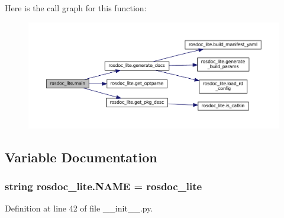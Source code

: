 Here is the call graph for this function\+:
\nopagebreak
\begin{figure}[H]
\begin{center}
\leavevmode
\includegraphics[width=350pt]{namespacerosdoc__lite_af17b2a5046f7827add27b1cc8deb06a0_cgraph}
\end{center}
\end{figure}




\subsection{Variable Documentation}
\subsubsection[{\texorpdfstring{N\+A\+ME}{NAME}}]{\setlength{\rightskip}{0pt plus 5cm}string rosdoc\+\_\+lite.\+N\+A\+ME = \textquotesingle{}rosdoc\+\_\+lite\textquotesingle{}}\hypertarget{namespacerosdoc__lite_ac37840c9b7dc02eeeca2fa97cbd04020}{}\label{namespacerosdoc__lite_ac37840c9b7dc02eeeca2fa97cbd04020}


Definition at line 42 of file \+\_\+\+\_\+init\+\_\+\+\_\+.\+py.

